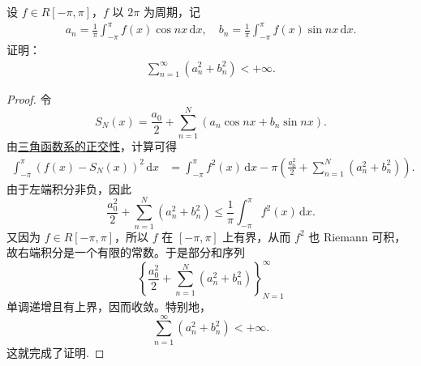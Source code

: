 \documentclass[../../main.tex]{subfiles}%
\begin{document}
\begin{example}
设 $f \in R[-\pi, \pi]$，$f$ 以 $2\pi$ 为周期，记
\begin{align*}
a_n = \frac{1}{\pi} \int_{-\pi}^{\pi} f(x) \cos nx\,\mathrm{d}x,\quad b_n = \frac{1}{\pi} \int_{-\pi}^{\pi} f(x) \sin nx\,\mathrm{d}x.
\end{align*}
证明：
\begin{align*}
\sum\limits_{n=1}^{\infty} (a_n^2 + b_n^2) < +\infty.
\end{align*}
\end{example}
\begin{proof}
令
\[
S_N(x)=\frac{a_0}{2}+\sum_{n=1}^N (a_n\cos nx+b_n\sin nx).
\]
由\hyperref[proposition:三角函数系的正交性]{三角函数系的正交性}，计算可得
\begin{align*}
\int_{-\pi}^{\pi} (f(x)-S_N(x))^2\,\mathrm{d}x
&= \int_{-\pi}^{\pi} f^2(x)\,\mathrm{d}x
- \pi\left(\frac{a_0^2}{2}+\sum_{n=1}^N (a_n^2+b_n^2)\right).
\end{align*}
由于左端积分非负，因此
\[
\frac{a_0^2}{2}+\sum_{n=1}^N (a_n^2+b_n^2)
\leqslant \frac{1}{\pi}\int_{-\pi}^{\pi} f^2(x)\,\mathrm{d}x.
\]
又因为 \(f\in R[-\pi,\pi]\)，所以 \(f\) 在 \([-\pi,\pi]\) 上有界，从而 \(f^2\) 也 Riemann 可积，故右端积分是一个有限的常数。于是部分和序列
\[
\left\{\frac{a_0^2}{2}+\sum_{n=1}^N (a_n^2+b_n^2)\right\}_{N=1}^{\infty}
\]
单调递增且有上界，因而收敛。特别地，
\[
\sum_{n=1}^{\infty}(a_n^2+b_n^2) < +\infty.
\]
这就完成了证明.
\end{proof}
\end{document}

